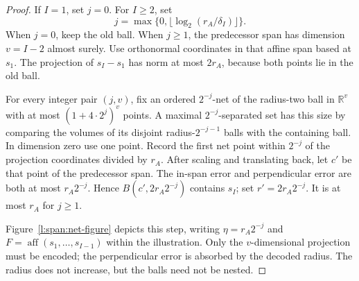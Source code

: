 \begin{proof}
If \(I=1\), set \(j=0\).  For \(I\ge2\), set
\[
 j=\max\{0,\lfloor\log_2(r_A/\delta_I)\rfloor\}.
\]
When \(j=0\), keep the old ball.  When \(j\ge1\), the predecessor
span has dimension \(v=I-2\) almost surely.  Use orthonormal
coordinates in that affine span based at \(s_1\).  The projection
of \(s_I-s_1\) has norm at most \(2r_A\), because both points lie
in the old ball.

For every integer pair \((j,v)\), fix an ordered \(2^{-j}\)-net of
the radius-two ball in \(\mathbb R^v\) with at most
\((1+4\cdot2^j)^v\) points.  A maximal \(2^{-j}\)-separated set has
this size by comparing the volumes of its disjoint radius-\(2^{-j-1}\)
balls with the containing ball.  In dimension zero use one point.
Record the first net point within \(2^{-j}\) of the projection
coordinates divided by \(r_A\).  After scaling and translating back,
let \(c'\) be that point of the predecessor span.  The in-span error
and perpendicular error are both at most \(r_A2^{-j}\).  Hence
\(B(c',2r_A2^{-j})\) contains \(s_I\); set \(r'=2r_A2^{-j}\).
It is at most \(r_A\) for \(j\ge1\).

Figure~\ref{l:span:net-figure} depicts this step, writing
\(\eta=r_A2^{-j}\) and \(F=\operatorname{aff}(s_1,\ldots,s_{I-1})\)
within the illustration. Only the \(v\)-dimensional projection must be
encoded; the perpendicular error is absorbed by the decoded radius.
The radius does not increase, but the balls need not be nested.


\end{proof}
